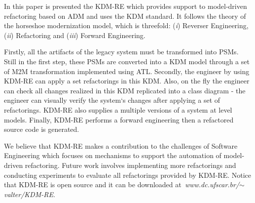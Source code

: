 In this paper is presented the KDM-RE which provides support to model-driven refactoring based on ADM and uses the KDM standard. It follows the theory of the horseshoe modernization model, which is threefold: (\textit{i}) Reverser Engineering, (\textit{ii}) Refactoring and  (\textit{iii}) Forward Engineering. 

Firstly, all the artifacts of the legacy system must be transformed into PSMs. Still in the first step, these PSMs are converted into a KDM model through a set of M2M transformation implemented using ATL. Secondly, the engineer by using KDM-RE can apply a set refactorings in this KDM. Also, on the fly the engineer can check all changes realized in this KDM replicated into a class diagram - the engineer can visually verify the system`s changes after applying a set of refactorings. KDM-RE also supplies a multiple versions of a system at level models. Finally, KDM-RE performs a forward engineering then a refactored source code is generated.

We believe that KDM-RE makes a contribution to the challenges of Software Engineering which focuses on mechanisms to support the automation of model-driven refactoring. Future work involves implementing more refactorings and conducting experiments to evaluate all refactorings provided by KDM-RE. Notice that KDM-RE is open source and it can be downloaded at\textit{~www.dc.ufscar.br/$\sim$valter/KDM-RE}.
